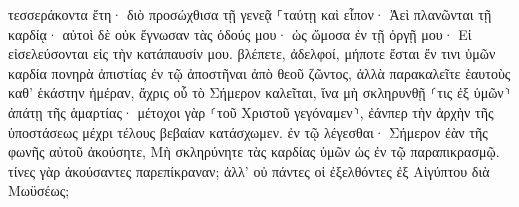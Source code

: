 \documentclass{openreader}
\begin{document}
τεσσεράκοντα ἔτη· διὸ προσώχθισα τῇ γενεᾷ ⸀ταύτῃ καὶ εἶπον· Ἀεὶ πλανῶνται τῇ καρδίᾳ· αὐτοὶ δὲ οὐκ ἔγνωσαν τὰς ὁδούς μου· 
ὡς ὤμοσα ἐν τῇ ὀργῇ μου· Εἰ εἰσελεύσονται εἰς τὴν κατάπαυσίν μου. 
βλέπετε, ἀδελφοί, μήποτε ἔσται ἔν τινι ὑμῶν καρδία πονηρὰ ἀπιστίας ἐν τῷ ἀποστῆναι ἀπὸ θεοῦ ζῶντος, 
ἀλλὰ παρακαλεῖτε ἑαυτοὺς καθ’ ἑκάστην ἡμέραν, ἄχρις οὗ τὸ Σήμερον καλεῖται, ἵνα μὴ σκληρυνθῇ ⸂τις ἐξ ὑμῶν⸃ ἀπάτῃ τῆς ἁμαρτίας· 
μέτοχοι γὰρ ⸂τοῦ Χριστοῦ γεγόναμεν⸃, ἐάνπερ τὴν ἀρχὴν τῆς ὑποστάσεως μέχρι τέλους βεβαίαν κατάσχωμεν. 
ἐν τῷ λέγεσθαι· Σήμερον ἐὰν τῆς φωνῆς αὐτοῦ ἀκούσητε, Μὴ σκληρύνητε τὰς καρδίας ὑμῶν ὡς ἐν τῷ παραπικρασμῷ. 
τίνες γὰρ ἀκούσαντες παρεπίκραναν; ἀλλ’ οὐ πάντες οἱ ἐξελθόντες ἐξ Αἰγύπτου διὰ Μωϋσέως; 
\end{document}

